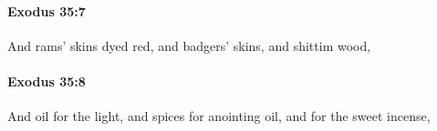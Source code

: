 		\paragraph{Exodus 35:7} %
			\label{EXODUS-35-7}

			And rams' skins dyed red, and badgers' skins, and shittim wood,


		\paragraph{Exodus 35:8} %
			\label{EXODUS-35-8}

			And oil for the light, and spices for anointing oil, and for the sweet incense,


